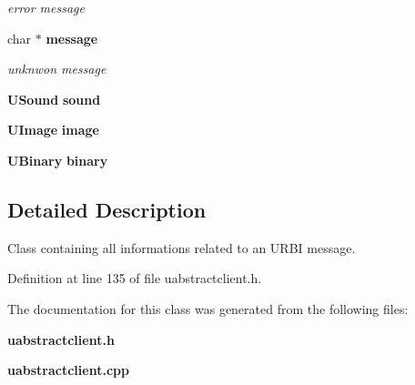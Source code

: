 \begin{CompactItemize}
\begin{CompactList}\small\item\em error message \item\end{CompactList}\item 
char $\ast$ {\bf message}\label{classUMessage_o9}

\begin{CompactList}\small\item\em unknwon message \item\end{CompactList}\item 
{\bf USound} {\bf sound}\label{classUMessage_o10}

\item 
{\bf UImage} {\bf image}\label{classUMessage_o11}

\item 
{\bf UBinary} {\bf binary}\label{classUMessage_o12}

\end{CompactItemize}


\subsection{Detailed Description}
Class containing all informations related to an URBI message. 



Definition at line 135 of file uabstractclient.h.

The documentation for this class was generated from the following files:\begin{CompactItemize}
\item 
{\bf uabstractclient.h}\item 
{\bf uabstractclient.cpp}\end{CompactItemize}
